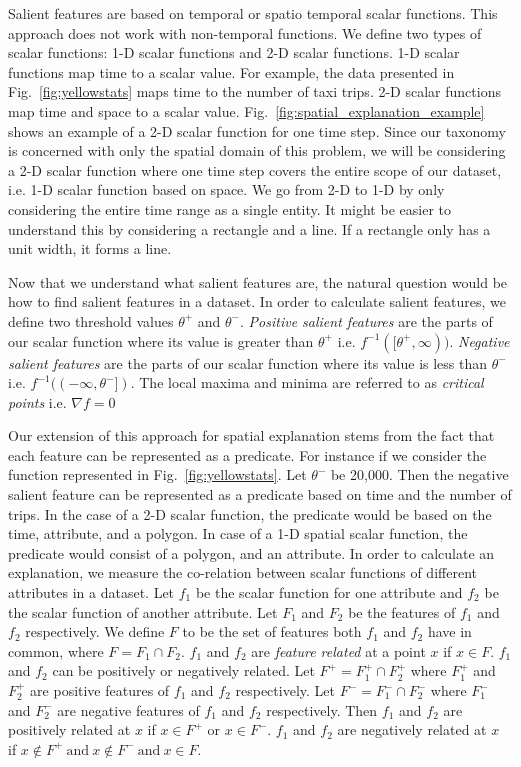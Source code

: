 Salient features are based on temporal or spatio temporal scalar functions. This approach does not work with non-temporal functions. We define two types of scalar functions: 1-D scalar functions and 2-D scalar functions. 1-D scalar functions map time to a scalar value. For example, the data presented in Fig.~\ref{fig:yellowstats} maps time to the number of taxi trips. 2-D scalar functions map time and space to a scalar value.  Fig.~\ref{fig:spatial_explanation_example} shows an example of a 2-D scalar function for one time step. Since our taxonomy is concerned with only the spatial domain of this problem, we will be considering a 2-D scalar function where one time step covers the entire scope of our dataset, i.e. 1-D scalar function based on space. We go from 2-D to 1-D by only considering the entire time range as a single entity. It might be easier to understand this by considering a rectangle and a line. If a rectangle only has a unit width, it forms a line.

Now that we understand what salient features are, the natural question would be how to find salient features in a dataset. In order to calculate salient features, we define two threshold values $\theta^+$ and $\theta^-$. \textit{Positive salient features} are the parts of our scalar function where its value is greater than $\theta^+$ i.e. $f^{-1}([\theta^+, \infty))$. \textit{Negative salient features} are the parts of our scalar function where its value is less than $\theta^-$ i.e. $f^{-1}((-\infty, \theta^-])$. The local maxima and minima are referred to as \textit{critical points} i.e. $\nabla f = 0$

Our extension of this approach for spatial explanation stems from the fact that each feature can be represented as a predicate. For instance if we consider the function represented in Fig.~\ref{fig:yellowstats}. Let $\theta^-$ be 20,000. Then the negative salient feature can be represented as a predicate based on time and the number of trips. In the case of a 2-D scalar function, the predicate would be based on the time, attribute, and a polygon. In case of a 1-D spatial scalar function, the predicate would consist of a polygon, and an attribute. In order to calculate an explanation, we measure the co-relation between scalar functions of different attributes in a dataset. Let $f_1$ be the scalar function for one attribute and $f_2$ be the scalar function of another attribute. Let $F_1$ and $F_2$ be the features of $f_1$ and $f_2$ respectively. We define $F$ to be the set of features both $f_1$ and $f_2$ have in common, where  $ F = F_1 \cap F_2$. $f_1$ and $f_2$ are \textit{feature related} at a point $x$ if $x \in F$. $f_1$ and $f_2$ can be positively or negatively related. Let $F^+ = F_1^+ \cap F_2^+$ where $F_1^+$ and $F_2^+$ are positive features of $f_1$ and $f_2$ respectively. Let $F^- = F_1^- \cap F_2^-$ where $F_1^-$ and $F_2^-$ are negative features of $f_1$ and $f_2$ respectively. Then $f_1$ and $f_2$ are positively related at $x$ if $x \in F^+$  or $x \in F^-$. $f_1$ and $f_2$ are negatively related at $x$ if $x \notin F^+\ \text{and}\ x \notin F^-\ \text{and}\ x\in F$.

